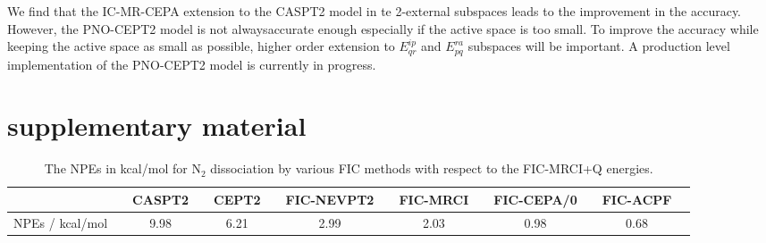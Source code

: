 \documentclass[aip,jcp,amsmath]{revtex4-1}
\begin{document}
%
We find that the IC-MR-CEPA extension to the CASPT2 model in te 2-external subspaces leads to the improvement in the accuracy.
%
However, the PNO-CEPT2 model is not alwaysaccurate enough especially if the active space is too small.
%
To improve the accuracy while keeping the active space as small as possible, higher order extension to $E^{ip}_{qr}$ and $E^{ra}_{pq}$ subspaces will be important.
%
A production level implementation of the PNO-CEPT2 model is currently in progress.

\section*{supplementary material}

\begin{acknowledgments}  
  
\end{acknowledgments}




\newpage

{
  \begin{longtable}[!ht]{cccccccccccccc}
  \caption{\label{tab:dissociationN2-NPE}
    The NPEs in kcal/mol for N${}_2$ dissociation by various FIC methods with respect to the FIC-MRCI+Q energies.
  }
\\
\hline
\hline
{}               && CASPT2 && CEPT2 && FIC-NEVPT2 && FIC-MRCI && FIC-CEPA/0 && FIC-ACPF \\
\hline
NPEs  / kcal/mol &&   9.98 &&  6.21 &&       2.99 &&     2.03 &&       0.98 && 0.68 \\
\hline
\hline
\end{longtable}
}

\newpage
\end{document}
